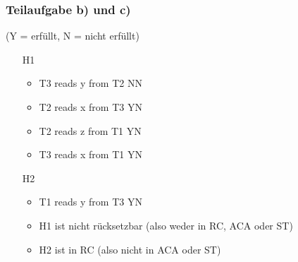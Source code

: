 \documentclass[a4paper,9pt]{scrartcl}
\begin{document}
\subsubsection{Teilaufgabe b) und c)}
(Y = erfüllt, N = nicht erfüllt)
\begin{itemize}
\item[H1]
    \begin{itemize}
        \item T3 reads y from T2 NN
        \item T2 reads x from T3 YN
        \item T2 reads z from T1 YN
        \item T3 reads x from T1 YN
    \end{itemize}
\item[H2]
    \begin{itemize}
        \item T1 reads y from T3 YN
        \item H1 ist nicht rücksetzbar (also weder in RC, ACA oder ST)
        \item H2 ist in RC (also nicht in ACA oder ST)
    \end{itemize}
\end{itemize}
\end{document}

